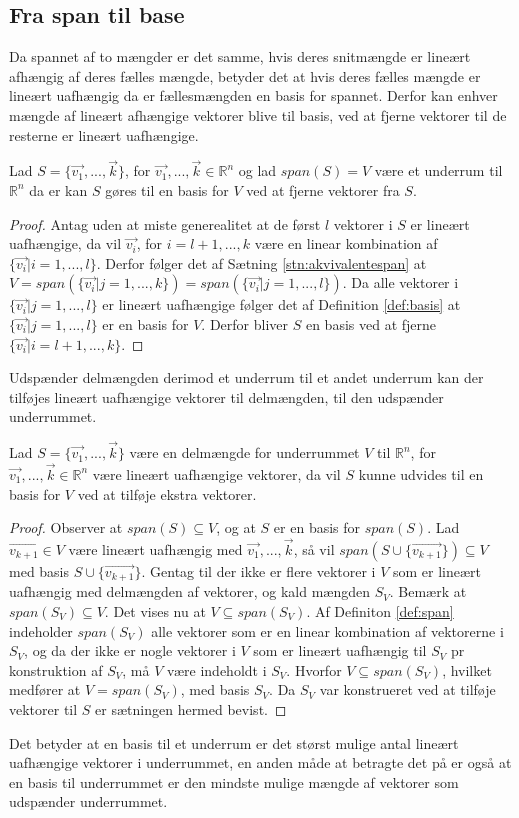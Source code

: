 \subsection{Fra span til base}
Da spannet af to mængder er det samme, hvis deres snitmængde er lineært afhængig af deres fælles mængde, betyder det at hvis deres fælles mængde er lineært uafhængig da er fællesmængden en basis for spannet.
Derfor kan enhver mængde af lineært afhængige vektorer blive til basis, ved at fjerne vektorer til de resterne er lineært uafhængige.
\begin{stn}
Lad $S=\{\vec{v_1}, ..., \vec{k}\}$, for $\vec{v_1}, ..., \vec{k} \in \mathds{R}^n$ og lad $span(S) = V$ være et underrum til $\mathds{R}^n$ da er kan $S$ gøres til en basis for $V$ ved at fjerne vektorer fra $S$.
\label{stn:reduceringbasis}
\end{stn}
\begin{proof}
Antag uden at miste generealitet at de først $l$ vektorer i $S$ er  lineært uafhængige, da vil $\vec{v_i}$, for $i = l+1,...,k$ være en linear kombination af $\{\vec{v_i} | i = 1,...,l\}$. 
Derfor følger det af Sætning \ref{stn:akvivalentespan} at $V = span(\{\vec{v_i}| j =1,...,k\}) =span(\{\vec{v_i}| j=1,...,l\})$.
Da alle vektorer i $\{\vec{v_i}| j=1,...,l\}$ er lineært uafhængige følger det af Definition \ref{def:basis} at $\{\vec{v_i}| j=1,...,l\}$ er en basis for $V$. 
Derfor bliver $S$ en basis ved at fjerne $\{\vec{v_i}| i = l+1,...,k\}$.
\end{proof}
Udspænder delmængden derimod et underrum til et andet underrum kan der tilføjes lineært uafhængige vektorer til delmængden, til den udspænder underrummet.
\begin{stn}
Lad $S=\{\vec{v_1}, ..., \vec{k}\}$ være en delmængde for underrummet $V$ til $\mathds{R}^n$, for $\vec{v_1}, ..., \vec{k} \in \mathds{R}^n$ være lineært uafhængige vektorer, da vil $S$ kunne udvides til en basis for $V$ ved at tilføje ekstra vektorer.
\end{stn}
\begin{proof}
Observer at $span(S) \subseteq V$, og at $S$ er en basis for $span(S)$.
Lad $\vec{v_{k+1}} \in V$ være lineært uafhængig med $\vec{v_1}, ..., \vec{k}$, så vil $span(S\cup\{\vec{v_{k+1}}\}) \subseteq V$ med basis $S\cup\{\vec{v_{k+1}}\}$. 
Gentag til der ikke er flere vektorer i $V$ som er lineært uafhængig med delmængden af vektorer, og kald mængden $S_V$.
Bemærk at $span(S_V) \subseteq V$.
Det vises nu at $V \subseteq span(S_V)$. 
Af Definiton \ref{def:span} indeholder $span(S_V)$ alle vektorer som er en linear kombination af vektorerne i $S_V$, og da der ikke er nogle vektorer i $V$ som er lineært uafhængig til $S_V$ pr konstruktion af $S_V$, må $V$ være indeholdt i $S_V$. 
Hvorfor $V \subseteq span(S_V)$, hvilket medfører at $V = span(S_V)$, med basis $S_V$. 
Da $S_V$ var konstrueret ved at tilføje vektorer til $S$ er sætningen hermed bevist.
\end{proof}
Det betyder at en basis til et underrum er det størst mulige antal lineært uafhængige vektorer i underrummet, en anden måde at betragte det på er også at en basis til underrummet er den mindste mulige mængde af vektorer som udspænder underrummet.





